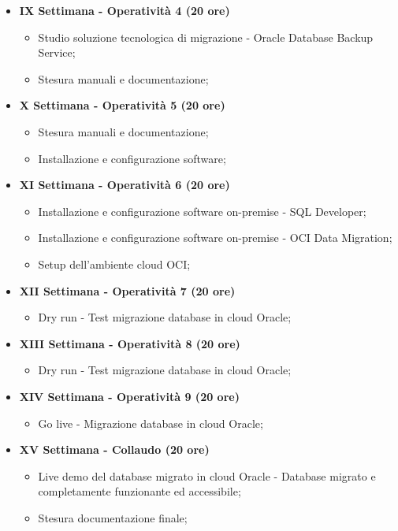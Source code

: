 {\begin{itemize}
        \item \textbf{IX Settimana - Operatività 4 (20 ore)} %
        \begin{itemize}
            \item Studio soluzione tecnologica di migrazione - Oracle Database Backup Service;
            \item Stesura manuali e documentazione;
        \end{itemize}

        \item \textbf{X Settimana - Operatività 5 (20 ore)} %
        \begin{itemize}
            \item Stesura manuali e documentazione;
            \item Installazione e configurazione software;
        \end{itemize}

        \item \textbf{XI Settimana - Operatività 6 (20 ore)} %
        \begin{itemize}
            \item Installazione e configurazione software on-premise - SQL Developer;
            \item Installazione e configurazione software on-premise - OCI Data Migration;
            \item Setup dell'ambiente cloud OCI;
        \end{itemize}

        \item \textbf{XII Settimana - Operatività 7 (20 ore)} %
        \begin{itemize}
            \item Dry run - Test migrazione database in cloud Oracle;
        \end{itemize}

        \item \textbf{XIII Settimana - Operatività 8 (20 ore)} %
        \begin{itemize}
            \item Dry run - Test migrazione database in cloud Oracle;
        \end{itemize}

        \item \textbf{XIV Settimana - Operatività 9 (20 ore)} %
        \begin{itemize}
            \item Go live - Migrazione database in cloud Oracle;
        \end{itemize}

        \item \textbf{XV Settimana - Collaudo (20 ore)} %
        \begin{itemize}
            \item Live demo del database migrato in cloud Oracle - Database migrato e completamente funzionante ed accessibile;
            \item Stesura documentazione finale;
        \end{itemize}
    \end{itemize}
}

